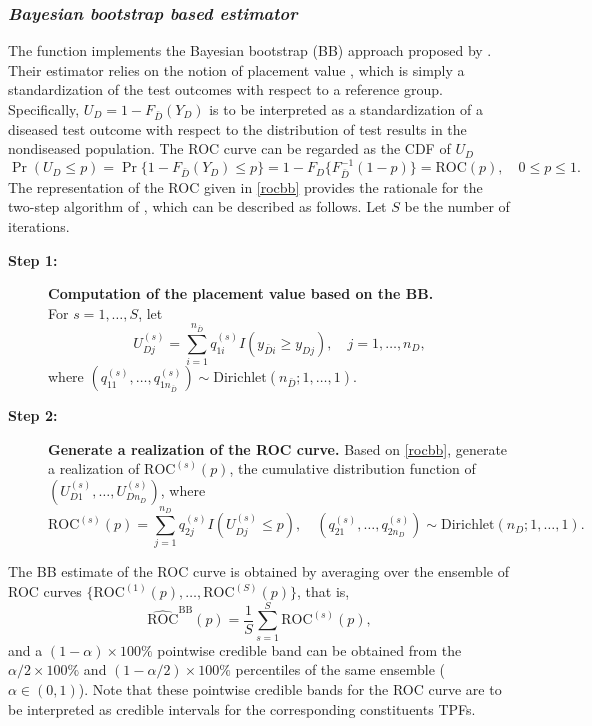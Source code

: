 \subsubsection{\textit{Bayesian bootstrap based estimator}}
The function  implements the Bayesian bootstrap (BB) approach proposed by \cite{Gu2008}. Their estimator relies on the notion of placement value \citep[][Chapter 5]{Pepe03}, which is simply a standardization of the test outcomes with respect to a reference group. Specifically, $U_D= 1-F_{\bar{D}}(Y_D)$ is to be interpreted as a standardization of a diseased test outcome with respect to the distribution of test results in the nondiseased population. The ROC curve can be regarded as the CDF of $U_D$
\begin{equation}\label{rocbb}
\Pr(U_D\leq p) = \Pr\{1-F_{\bar{D}}(Y_D)\leq p\}=1-F_{D}\{F_{\bar{D}}^{-1}(1-p)\}=\text{ROC}(p),\quad 0\leq p \leq 1.
\end{equation}
The representation of the ROC given in \eqref{rocbb} provides the rationale for the two-step algorithm of \cite{Gu2008}, which can be described as follows. Let $S$ be the number of iterations.
\begin{description}
\item [\textbf{Step 1:}] \textbf{Computation of the placement value  based on the BB.}\\
For $s=1,\ldots,S$, let
\begin{equation*}
U_{Dj}^{(s)}=\sum_{i=1}^{n_{\bar{D}}}q_{1i}^{(s)}I\left(y_{\bar{D}i}\geq y_{Dj}\right), \quad j=1,\ldots,n_{D},
\end{equation*}
where $\left(q_{11}^{(s)},\ldots,q_{1n_{\bar{D}}}^{(s)}\right)\sim\text{Dirichlet}(n_{\bar{D}};1,\ldots,1)$.
\item [\textbf{Step 2:}] \textbf{Generate a realization of the ROC curve.}
Based on \eqref{rocbb}, generate a realization of $\text{ROC}^{(s)}(p)$, the cumulative distribution function of $(U_{D1}^{(s)},\ldots,U_{Dn_D}^{(s)})$, where
\begin{equation*}
\text{ROC}^{(s)}(p)=\sum_{j=1}^{n_D}q_{2j}^{(s)}I\left(U_{Dj}^{(s)}\leq p\right),\quad \left(q_{21}^{(s)},\ldots,q_{2n_{D}}^{(s)}\right)\sim\text{Dirichlet}(n_D;1,\ldots,1).
\end{equation*}
\end{description}
The BB estimate of the ROC curve is obtained by averaging over the ensemble of ROC curves $\{\text{ROC}^{(1)}(p),\ldots,\text{ROC}^{(S)}(p)\}$, that is,
\begin{equation*}
\widehat{\text{ROC}}^{\text{BB}}(p)=\frac{1}{S}\sum_{s=1}^{S}\text{ROC}^{(s)}(p),
\end{equation*}
and a $(1-\alpha)\times 100\%$ pointwise credible band can be obtained from the $\alpha/2\times 100\%$ and $(1- \alpha/2)\times 100\%$ percentiles of the same ensemble ($\alpha \in (0,1)$). Note that these pointwise credible bands for the ROC curve are to be interpreted as credible intervals for the corresponding constituents TPFs.

